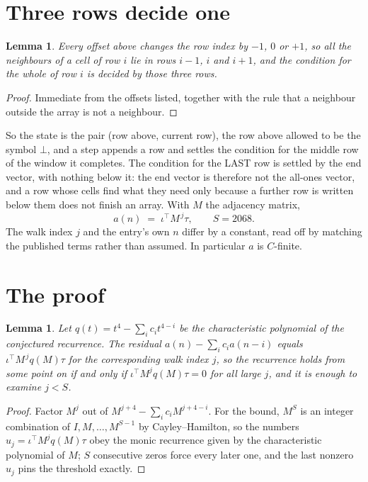 \documentclass[11pt,a4paper]{article}
\theoremstyle{plain}
\newtheorem{lemma}[theorem]{Lemma}
\theoremstyle{definition}
\begin{document}
\section{Three rows decide one}

\begin{lemma}\label{lem:win}
Every offset above changes the row index by $-1$, $0$ or $+1$, so all the neighbours of a cell
of row $i$ lie in rows $i-1$, $i$ and $i+1$, and the condition for the whole of row $i$ is
decided by those three rows.
\end{lemma}

\begin{proof}
Immediate from the offsets listed, together with the rule that a neighbour outside the array is
not a neighbour.
\end{proof}

So the state is the pair (row above, current row), the row above allowed to be the symbol
$\bot$, and a step appends a row and settles the condition for the middle row of the window it
completes. The condition for the LAST row is settled by the end vector, with nothing below it:
the end vector is therefore not the all-ones vector, and a row whose cells find what they need
only because a further row is written below them does not finish an array. With $M$ the
adjacency matrix,
\[
a(n)\;=\;\iota^{\!\top}M^{\,j}\tau ,\qquad S=2068.
\]
The walk index $j$ and the entry's own $n$ differ by a constant, read off by matching the
published terms rather than assumed. In particular $a$ is $C$-finite.

\section{The proof}

\begin{lemma}\label{lem:crit}
Let $q(t)=t^{4}-\sum_i c_it^{4-i}$ be the characteristic polynomial of the
conjectured recurrence. The residual $a(n)-\sum_ic_ia(n-i)$ equals
$\iota^{\!\top}M^{\,j}q(M)\tau$ for the corresponding walk index $j$, so the recurrence
holds from some point on if and only if $\iota^{\!\top}M^{j}q(M)\tau=0$ for all large $j$,
and it is enough to examine $j<S$.
\end{lemma}

\begin{proof}
Factor $M^{j}$ out of $M^{j+4}-\sum_ic_iM^{j+4-i}$. For the bound, $M^{S}$
is an integer combination of $I,M,\dots,M^{S-1}$ by Cayley--Hamilton, so the numbers
$u_j=\iota^{\!\top}M^{j}q(M)\tau$ obey the monic recurrence given by the characteristic
polynomial of $M$; $S$ consecutive zeros force every later one, and the last nonzero $u_j$
pins the threshold exactly.
\end{proof}
\end{document}
